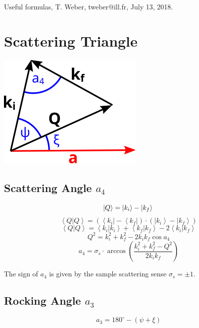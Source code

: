 \documentclass{article}
\begin{document}
Useful formulas, T. Weber, tweber@ill.fr, July 13, 2018.


\section{Scattering Triangle}
\begin{center}
	\includegraphics[width = 0.2 \textwidth]{triangle}
\end{center}


\subsection*{Scattering Angle $a_4$}

\begin{equation} \left| Q \right> = \left| k_i \right> - \left| k_f \right> \\ \end{equation}
\begin{equation} \left< Q | Q \right> = \left( \left< k_i \right| - \left< k_f \right| \right) \cdot \left( \left| k_i \right> - \left| k_f \right> \right) \end{equation}
\begin{equation} \left< Q | Q \right> = \left< k_i | k_i \right> + \left< k_f | k_f \right> - 2 \left< k_i | k_f \right> \end{equation}
\begin{equation} Q^2 = k_i^2 + k_f^2 - 2 k_i k_f \cos a_4 \end{equation}
\begin{equation} \boxed{ a_4 = \sigma_s \cdot \arccos \left( \frac{k_i^2 + k_f^2 - Q^2}{2 k_i k_f} \right) } \end{equation}

The sign of $a_4$ is given by the sample scattering sense $\sigma_s = \pm 1$.



\subsection*{Rocking Angle $a_3$}

\begin{equation} \boxed{ a_3 = 180^{\circ} - \left( \psi + \xi \right) } \end{equation}
\end{document}
